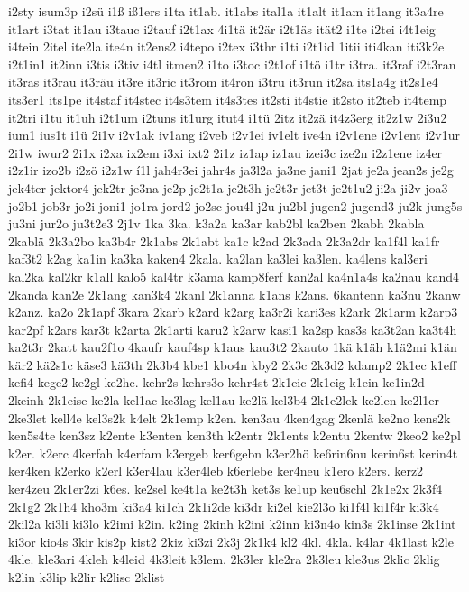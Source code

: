 {i2sty
isum3p
i2sü
i1ß
iß1ers
i1ta
it1ab.
it1abs
ital1a
it1alt
it1am
it1ang
it3a4re
it1art
i3tat
it1au
i3tauc
i2tauf
i2t1ax
4i1tä
it2är
i2t1äs
ität2
i1te
i2tei
i4t1eig
i4tein
2itel
ite2la
ite4n
it2ens2
i4tepo
i2tex
i3thr
i1ti
i2t1id
1itii
iti4kan
iti3k2e
i2t1in1
it2inn
i3tis
i3tiv
i4tl
itmen2
i1to
i3toc
i2t1of
i1tö
i1tr
i3tra.
it3raf
i2t3ran
it3ras
it3rau
it3räu
it3re
it3ric
it3rom
it4ron
i3tru
it3run
it2sa
its1a4g
it2s1e4
its3er1
its1pe
it4staf
it4stec
it4s3tem
it4s3tes
it2sti
it4stie
it2sto
it2teb
it4temp
it2tri
i1tu
it1uh
i2t1um
i2tuns
it1urg
itut4
i1tü
2itz
it2zä
it4z3erg
it2z1w
2i3u2
ium1
ius1t
i1ü
2i1v
i2v1ak
iv1ang
i2veb
i2v1ei
iv1elt
ive4n
i2v1ene
i2v1ent
i2v1ur
2i1w
iwur2
2i1x
i2xa
ix2em
i3xi
ixt2
2i1z
iz1ap
iz1au
izei3c
ize2n
i2z1ene
iz4er
i2z1ir
izo2b
i2zö
i2z1w
í1l
jah4r3ei
jahr4s
ja3l2a
ja3ne
jani1
2jat
je2a
jean2s
je2g
jek4ter
jektor4
jek2tr
je3na
je2p
je2t1a
je2t3h
je2t3r
jet3t
je2t1u2
ji2a
ji2v
joa3
jo2b1
job3r
jo2i
joni1
jo1ra
jord2
jo2sc
jou4l
j2u
ju2bl
jugen2
jugend3
ju2k
jung5s
ju3ni
jur2o
ju3t2e3
2j1v
1ka
3ka.
k3a2a
ka3ar
kab2bl
ka2ben
2kabh
2kabla
2kablä
2k3a2bo
ka3b4r
2k1abs
2k1abt
ka1c
k2ad
2k3ada
2k3a2dr
ka1f4l
ka1fr
kaf3t2
k2ag
ka1in
ka3ka
kaken4
2kala.
ka2lan
ka3lei
ka3len.
ka4lens
kal3eri
kal2ka
kal2kr
k1all
kalo5
kal4tr
k3ama
kamp8ferf
kan2al
ka4n1a4s
ka2nau
kand4
2kanda
kan2e
2k1ang
kan3k4
2kanl
2k1anna
k1ans
k2ans.
6kantenn
ka3nu
2kanw
k2anz.
ka2o
2k1apf
3kara
2karb
k2ard
k2arg
ka3r2i
kari3es
k2ark
2k1arm
k2arp3
kar2pf
k2ars
kar3t
k2arta
2k1arti
karu2
k2arw
kasi1
ka2sp
kas3s
ka3t2an
ka3t4h
ka2t3r
2katt
kau2f1o
4kaufr
kauf4sp
k1aus
kau3t2
2kauto
1kä
k1äh
k1ä2mi
k1än
kär2
kä2s1c
käse3
kä3th
2k3b4
kbe1
kbo4n
kby2
2k3c
2k3d2
kdamp2
2k1ec
k1eff
kefi4
kege2
ke2gl
ke2he.
kehr2s
kehrs3o
kehr4st
2k1eic
2k1eig
k1ein
ke1in2d
2keinh
2k1eise
ke2la
kel1ac
ke3lag
kel1au
ke2lä
kel3b4
2k1e2lek
ke2len
ke2l1er
2ke3let
kell4e
kel3s2k
k4elt
2k1emp
k2en.
ken3au
4ken4gag
2kenlä
ke2no
kens2k
ken5s4te
ken3sz
k2ente
k3enten
ken3th
k2entr
2k1ents
k2entu
2kentw
2keo2
ke2pl
k2er.
k2erc
4kerfah
k4erfam
k3ergeb
ker6gebn
k3er2hö
ke6rin6nu
kerin6st
kerin4t
ker4ken
k2erko
k2erl
k3er4lau
k3er4leb
k6erlebe
ker4neu
k1ero
k2ers.
kerz2
ker4zeu
2k1er2zi
k6es.
ke2sel
ke4t1a
ke2t3h
ket3s
ke1up
keu6schl
2k1e2x
2k3f4
2k1g2
2k1h4
kho3m
ki3a4
ki1ch
2k1i2de
ki3dr
ki2el
kie2l3o
ki1f4l
ki1f4r
ki3k4
2kil2a
ki3li
ki3lo
k2imi
k2in.
k2ing
2kinh
k2ini
k2inn
ki3n4o
kin3s
2k1inse
2k1int
ki3or
kio4s
3kir
kis2p
kist2
2kiz
ki3zi
2k3j
2k1k4
kl2
4kl.
4kla.
k4lar
4k1last
k2le
4kle.
kle3ari
4kleh
k4leid
4k3leit
k3lem.
2k3ler
kle2ra
2k3leu
kle3us
2klic
2klig
k2lin
k3lip
k2lir
k2lisc
2klist
}
